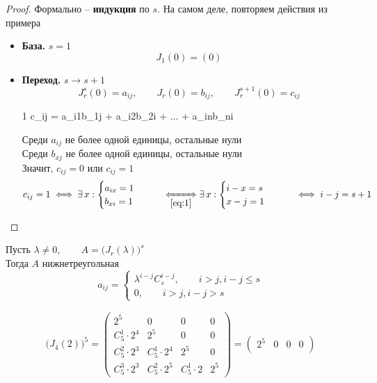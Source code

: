 \begin{props}
\begin{eg}
	\end{eg}
	\begin{proof}
		Формально -- \textbf{индукция} по $ s $. На самом деле, повторяем действия из примера
		\begin{itemize}
			\item \textbf{База.} $ s = 1 $
			$$ J_1(0) = (0) $$
			\item \textbf{Переход.} $ s \to s + 1 $
			$$ J_r^s(0) = a_{ij}, \qquad J_r(0) = b_{ij}, \qquad J_r^{s + 1}(0) = c_{ij} $$
			\begin{equ}1
				c_{ij} = a_{i1}b_{1j} + a_{i2}b_{2i} + ... + a_{in}b_{ni}
			\end{equ}
			Среди $ a_{ij} $ не более одной единицы, остальные нули \\
			Среди $ b_{xj} $ не более одной единицы, остальные нули \\
			Значит, $ c_{ij} = 0 $ или $ c_{ij} = 1 $
			$$ c_{ij} = 1 \iff \exist x :
			\begin{cases}
				a_{ix} = 1 \\
				b_{xi} = 1
			\end{cases} \qquad \underiff{\eref1} \exist x :
			\begin{cases}
				i - x = s \\
				x - j = 1
			\end{cases} \qquad \iff i - j = s + 1 $$
		\end{itemize}
	\end{proof}
	\item Пусть $ \lambda \ne 0, \qquad A = \bigg( J_r(\lambda) \bigg)^s $ \\
	Тогда $ A $ нижнетреугольная
	$$ a_{ij} =
	\begin{cases}
		\lambda^{i - j}C_s^{i - j}, \qquad i > j, i - j \le s \\
		0, \qquad i > j, i - j > s
	\end{cases} $$
	\begin{eg}
		\begin{multline*}
			\bigg( J_4(2) \bigg)^5 =
			\begin{pmatrix}
				2^5 & 0 & 0 & 0 \\
				C_5^1 \cdot 2^4 & 2^5 & 0 & 0 \\
				C_5^2 \cdot 2^3 & C_5^1 \cdot 2^4 & 2^5 & 0 \\
				C_5^3 \cdot 2^3 & C_5^2 \cdot 2^5 & C_5^1 \cdot 2 & 2^5
			\end{pmatrix} =
			\begin{pmatrix}
				2^5 & 0 & 0 & 0 \\

\end{pmatrix}
\end{multline*}
\end{eg}
\end{props}
